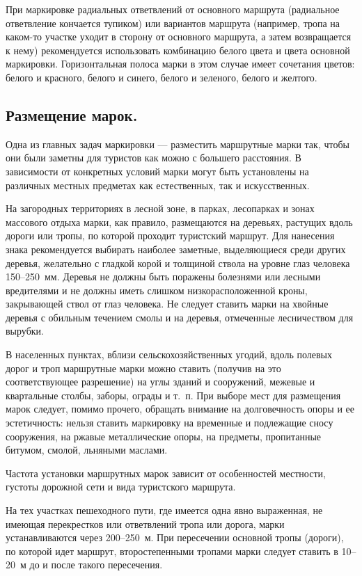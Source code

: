 \documentclass[a4paper,12pt]{extarticle}
\begin{document}
При маркировке радиальных ответвлений от основного маршрута (радиальное ответвление кончается тупиком) или вариантов
маршрута (например, тропа на каком-то участке уходит в сторону от основного маршрута, а затем возвращается к нему)
рекомендуется использовать комбинацию белого цвета и цвета основной маркировки. Горизонтальная полоса  марки в этом
случае имеет сочетания цветов: белого и красного, белого и синего, белого и зеленого, белого и желтого.

\subsection{Размещение марок.}

Одна из главных задач маркировки --- разместить маршрутные марки так, чтобы они были заметны для туристов как можно с
большего расстояния. В зависимости от конкретных условий марки могут быть установлены на различных местных предметах как
естественных, так и искусственных.

На загородных территориях в лесной зоне, в парках,
лесопарках и зонах массового отдыха марки, как правило, размещаются на деревьях, растущих вдоль дороги или тропы, по
которой проходит туристский маршрут. Для нанесения знака рекомендуется выбирать наиболее заметные, выделяющиеся среди
других деревья, желательно с гладкой корой и толщиной ствола на уровне глаз человека 150--250~мм. Деревья не должны быть
поражены болезнями или лесными вредителями и не должны иметь слишком низкорасположенной кроны, закрывающей ствол от глаз
человека. Не следует ставить марки на хвойные деревья с обильным течением смолы и на деревья, отмеченные лесничеством
для вырубки.

В населенных пунктах, вблизи сельскохозяйственных угодий, вдоль полевых дорог и троп маршрутные марки можно ставить
(получив на это соответствующее разрешение) на углы зданий и сооружений, межевые и квартальные столбы, заборы, ограды и
т.~п. При выборе мест для размещения марок следует, помимо прочего, обращать внимание на долговечность опоры и ее
эстетичность: нельзя ставить маркировку на временные и подлежащие сносу сооружения, на ржавые металлические опоры, на
предметы, пропитанные битумом, смолой, льняными маслами.

Частота установки маршрутных марок зависит от особенностей местности, густоты дорожной сети и вида туристского маршрута.

На тех участках пешеходного пути, где имеется одна явно выраженная, не имеющая перекрестков или ответвлений тропа или
дорога, марки устанавливаются через 200--250~м. При пересечении основной тропы (дороги), по которой идет маршрут,
второстепенными тропами марки следует ставить в 10--20~м до и после такого пересечения.
\end{document}
